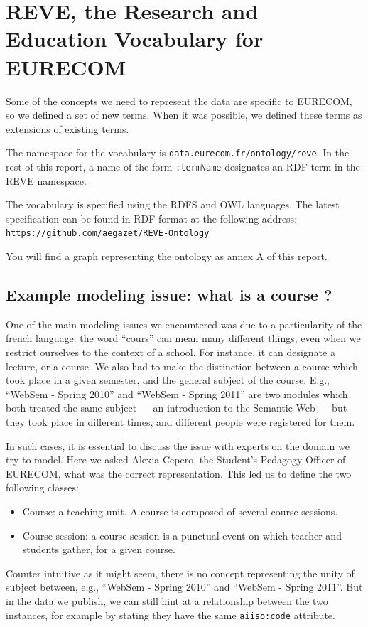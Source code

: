 \documentclass[a4paper,11pt]{report}
\begin{document}
\section{REVE, the Research and Education Vocabulary for \mbox{EURECOM}}
Some of the concepts we need to represent the data are specific to \mbox{EURECOM}, so we defined a set of new terms. When it was possible, we defined these terms as extensions of existing terms. 

The namespace for the vocabulary is  \texttt{data.eurecom.fr/ontology/reve}. In the rest of this report, a name of the form \texttt{:termName} designates an RDF term in the REVE namespace. 

The vocabulary is specified using the RDFS and OWL languages. The latest specification can be found in RDF format at the following address: \texttt{https://github.com/aegazet/REVE-Ontology}

You will find a graph representing the ontology as annex A of this report. 

\subsection{Example modeling issue: what is a course ?}
One of the main modeling issues we encountered was due to a particularity of the french language: the word ``cours'' can mean many different things, even when we restrict ourselves to the context of a school. For instance, it can designate a lecture, or a course. We also had to make the distinction between a course which took place in a given semester, and the general subject of the course. E.g., ``WebSem - Spring 2010'' and ``WebSem - Spring 2011'' are two modules which both treated the same subject --- an introduction to the Semantic Web --- but they took place in different times, and different people were registered for them. 

In such cases, it is essential to discuss the issue with experts on the domain we try to model. Here we asked Alexia Cepero, the Student's Pedagogy Officer of \mbox{EURECOM}, what was the correct representation. This led us to define the two following classes:
\begin{itemize}
\item Course: a teaching unit. A course is composed of several course sessions.
\item Course session: a course session is a punctual event on which teacher and students gather, for a given course.
\end{itemize}
Counter intuitive as it might seem, there is no concept representing the unity of subject between, e.g., ``WebSem - Spring 2010'' and ``WebSem - Spring 2011''. But in the data we publish, we can still hint at a relationship between the two instances, for example by stating they have the same \texttt{aiiso:code} attribute. 
\end{document}

